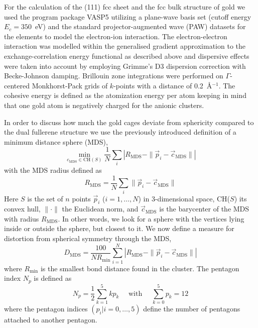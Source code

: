 For the calculation of the (111) fcc sheet and the fcc bulk structure of gold we used the program package VASP5\autocite{Kresse_Efficiencyabinitiototal_1996} utilizing a plane-wave basis set (cutoff energy $E_c=350$~eV) and the standard projector-augmented wave (PAW) datasets for the elements to model the electron-ion interaction\autocite{Blochl_Projectoraugmentedwavemethod_1994,Kresse_ultrasoftpseudopotentialsprojector_1999}. The electron-electron interaction was modelled within the generalised gradient approximation to the exchange-correlation energy functional as described above and dispersive effects were taken into account by employing Grimme's D3 dispersion correction with Becke-Johnson damping.\autocite{Grimme_consistentaccurateinitio_2010,Grimme_Effectdampingfunction_2011} Brillouin zone integrations were performed on $\Gamma$-centered Monkhorst-Pack grids of $k$-points with a distance of 0.2~\AA$^{-1}$.
The cohesive energy is defined as the atomization energy per atom keeping in mind that one gold atom is negatively charged for the anionic clusters.

In order to discuss how much the gold cages deviate from sphericity compared to the dual fullerene structure we use the previously introduced definition of a minimum distance sphere (MDS),\autocite{Schwerdtfeger_Programfullerenesoftware_2013}
\begin{equation} 
\min\limits_{c_\mathrm{MDS} \in \mathrm{CH}(S)} \frac{1}{N} \sum _{i} \left|R_\mathrm{MDS} -\| \vec{p}_{i}-\vec{c}_\mathrm{MDS} \| \right|  
\end{equation}
with the MDS radius defined as
\begin{equation} 
	R_{\mathrm{MDS}} =\frac{1}{N} \sum _{i}\| \vec{p}_{i} -\vec{c}_{\mathrm{MDS}} \|   
	\label{eq:RMDS}
\end{equation}
Here $S$ is the set of $n$ points $\vec{p}_i$ ($i=1,\ldots ,N$) in $3$-dimensional space, CH($S$) its convex hull, $\|\cdot\| $ the Euclidean norm, and $\vec{c}_\mathrm{MDS}$ is the barycenter of the MDS with radius $R_\mathrm{MDS}$. In other words, we look for a sphere with the vertices lying inside or outside the sphere, but closest to it. We now define a measure for distortion from spherical symmetry through the MDS,\autocite{Schwerdtfeger_Programfullerenesoftware_2013}
\begin{equation}
  \label{eq:DMDS}
  D_{\mathrm{MDS}} = \frac{100}{N R_\mathrm{min}} \sum_{i=1}^N \left|R_{\mathrm{MDS}} - \|\vec{p}_i - \vec{c}_{\mathrm{MDS}}\| \right|
\end{equation}
where $R_\mathrm{min}$ is the smallest bond distance found in the cluster. The pentagon index $N_p$ is defined as
\begin{equation}
  \label{pentindex}
  N_p = \frac{1}{2}\sum_{k=1}^{5} kp_k \quad \text{ with } \quad  \sum_{k=0}^{5} p_k = 12
\end{equation}
where the pentagon indices $(p_i | i=0, \dots , 5)$ define the number of pentagons attached to another pentagon.\autocite{Fowler-atlas-2006}


